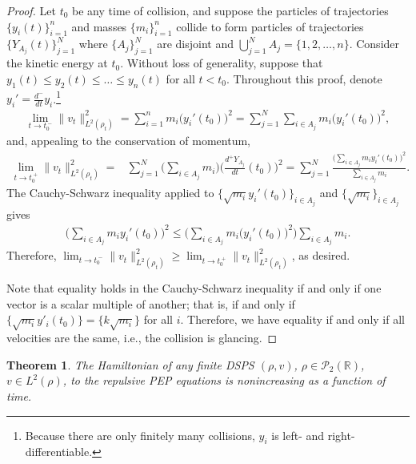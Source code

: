 \documentclass[11pt]{article}
\newtheorem{theorem}{Theorem}[section]
\numberwithin{equation}{section}
\begin{document}
        \begin{proof}
            Let $t_0$ be any time of collision, and suppose the particles of trajectories $\{y_i(t)\}_{i=1}^n$ and masses $\{m_i\}_{i=1}^n$ collide to form particles of trajectories $\{Y_{A_j}(t)\}_{j=1}^N$ where $\{A_j\}_{j=1}^N$ are disjoint and $\bigcup_{j=1}^N A_j=\{1,2,\ldots,n\}$. Consider the kinetic energy at $t_0$. Without loss of generality, suppose that $y_1(t)\leq y_2(t)\leq\ldots\leq y_n(t)$ for all $t<t_0$. Throughout this proof, denote $y_i'=\frac{d^{-}}{dt}y_i$.\footnote{Because there are only finitely many collisions, $y_i$ is left- and right-differentiable.}
            \begin{align*}
                \lim_{t\to t_0^{\ -}}\|v_t\|_{L^2(\rho_t)}^2=\sum_{i=1}^n m_i\big(y_i'(t_0)\big)^2
                =\sum_{j=1}^N\sum_{i\in A_j}m_i\big(y_i'(t_0)\big)^2,
            \end{align*}
            and, appealing to the conservation of momentum,  
            \begin{align*}
                \lim_{t\to t_0^{\ +}}\|v_t\|_{L^2(\rho_t)}^2=&\sum_{j=1}^N\Big(\sum_{i\in{A_j}}m_i\Big)\Big(\frac{d^+Y_{A_j}}{dt}(t_0)\Big)^2= \sum_{j=1}^N\frac{\Big(\sum_{i\in A_j}m_iy_i'(t_0)\Big)^2}{\sum_{i\in A_j}m_i}. 
            \end{align*}
            The Cauchy-Schwarz inequality applied to $\{\sqrt{m_i}y_i'(t_0)\}_{i\in A_j}$ and $\{\sqrt{m_i}\}_{i\in A_j}$ gives  
            \begin{align*}
                \Big(\sum_{i\in A_j}m_iy_i'(t_0)\Big)^2\leq\bigg(\sum_{i\in A_j}m_i\big(y_i'(t_0)\big)^2\bigg)\sum_{i\in A_j}m_i.
            \end{align*}
            Therefore, $\lim_{t\to t_0^{\ -}}\|v_t\|_{L^2(\rho_t)}^2\geq\lim_{t\to t_0^{\ +}}\|v_t\|_{L^2(\rho_t)}^2$, as desired. 
    
            Note that equality holds in the Cauchy-Schwarz inequality if and only if one vector is a scalar multiple of another; that is, if and only if $\{\sqrt{m_i}y'_i(t_0)\}=\{k\sqrt{m_i}\}$ for all $i$. Therefore, we have equality if and only if all velocities are the same, i.e., the collision is glancing. 
        \end{proof}
        \begin{theorem}\label{DSPS-Hamiltonian}
            The Hamiltonian of any finite DSPS $(\rho,v)$, $\rho\in\mathcal{P}_2(\mathbb{R})$, $v\in L^2(\rho)$, to the repulsive PEP equations is nonincreasing as a function of time. 
        \end{theorem}
\end{document}
